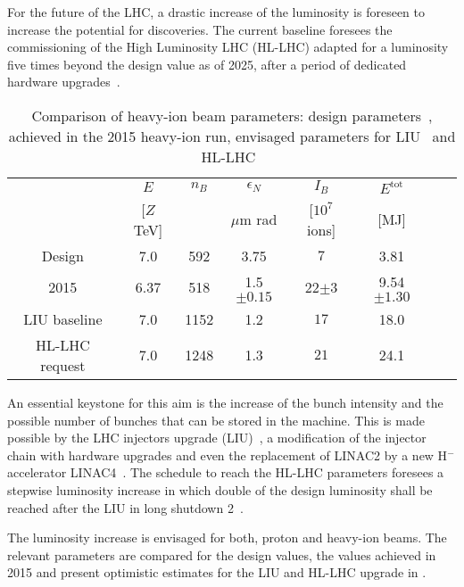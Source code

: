 For the future of the LHC, a drastic increase of the luminosity is foreseen to increase the potential for discoveries. The current baseline foresees the commissioning of the High Luminosity LHC (HL-LHC) adapted for a luminosity five times beyond the design value as of 2025, after a period of dedicated hardware upgrades~\cite{hllhc:asdhep}.
%
	\begin{table}[b]
		\centering
		\caption{Comparison of heavy-ion beam parameters: design parameters~\cite{CERN-2004-003-V1}, achieved in the 2015 heavy-ion run, envisaged parameters for LIU~\cite{IPAC11:WEPS017,IPAC2015:THPF093} and HL-LHC~\cite{}}
		\label{tab:LIU_HL_Parameters}
		
		\begin{tabular}{cccccccc}
			\toprule
			                        & $E$             & $n_B$   & $\epsilon_N$  & $I_B$             & $E^\text{tot}$     \\ %
			                        & {[}$Z$ TeV{]}	  &         &  $\mu$m rad   &  [$10^7$ ions]     & [MJ]             \\ \midrule
			Design                  & 7.0             & 592     & 3.75 & $7$               & 3.81             \\
			2015                    & 6.37            & 518     & 1.5$\pm 0.15$ & 22$\pm3$              & 9.54$\pm1.30$             \\
			LIU baseline            & 7.0             & 1152    & 1.2  & $17$              & 18.0             \\
			HL-LHC request          & 7.0             & 1248    & 1.3 & $21 $             & 24.1             \\ \bottomrule
		\end{tabular}
	\end{table}
%
An essential keystone for this aim is the increase of the bunch intensity and the possible number of bunches that can be stored in the machine. This is made possible by the LHC injectors upgrade (LIU)~\cite{IPAC11:WEPS017,IPAC2015:THPF093}, a modification of the injector chain with hardware upgrades and even the replacement of LINAC2 by a new H$^-$ accelerator LINAC4~\cite{IPAC2015:THPF093}. The schedule to reach the HL-LHC parameters foresees a stepwise luminosity increase in which double of the design luminosity shall be reached after the LIU in long shutdown 2~\cite{hllhc:asdhep}.

The luminosity increase is envisaged for both, proton and heavy-ion beams. The relevant parameters are compared for the design values, the values achieved in 2015 and present optimistic estimates for the LIU and HL-LHC upgrade in . 

